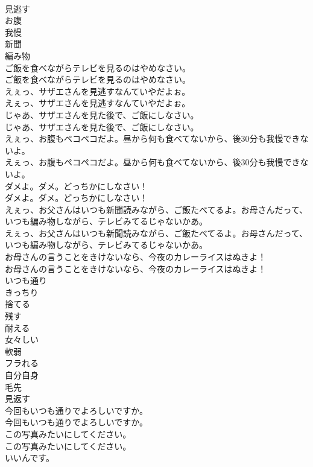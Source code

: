 \documentclass[8pt]{extreport}
\begin{document}
\begin{CJK}{UTF8}{min}
\\	見逃す
\\	お腹
\\	我慢
\\	新聞
\\	編み物
\\	ご飯を食べながらテレビを見るのはやめなさい。	
\\	ご飯を食べながらテレビを見るのはやめなさい。 
\\	えぇっ、サザエさんを見逃すなんていやだよぉ。	
\\	えぇっ、サザエさんを見逃すなんていやだよぉ。 
\\	じゃあ、サザエさんを見た後で、ご飯にしなさい。	
\\	じゃあ、サザエさんを見た後で、ご飯にしなさい。 
\\	えぇっ、お腹もペコペコだよ。昼から何も食べてないから、後30分も我慢できないよ。	
\\	えぇっ、お腹もペコペコだよ。昼から何も食べてないから、後30分も我慢できないよ。 
\\	ダメよ。ダメ。どっちかにしなさい！	
\\	ダメよ。ダメ。どっちかにしなさい！ 
\\	えぇっ、お父さんはいつも新聞読みながら、ご飯たべてるよ。お母さんだって、いつも編み物しながら、テレビみてるじゃないかあ。	
\\	えぇっ、お父さんはいつも新聞読みながら、ご飯たべてるよ。お母さんだって、いつも編み物しながら、テレビみてるじゃないかあ。 
\\	お母さんの言うことをきけないなら、今夜のカレーライスはぬきよ！	
\\	お母さんの言うことをきけないなら、今夜のカレーライスはぬきよ！ 
\\	いつも通り
\\	きっちり
\\	捨てる
\\	残す
\\	耐える
\\	女々しい
\\	軟弱
\\	フラれる
\\	自分自身
\\	毛先
\\	見返す
\\	今回もいつも通りでよろしいですか。	
\\	今回もいつも通りでよろしいですか。 
\\	この写真みたいにしてください。	
\\	この写真みたいにしてください。 
\\	いいんです。	

\end{CJK}
\end{document}

